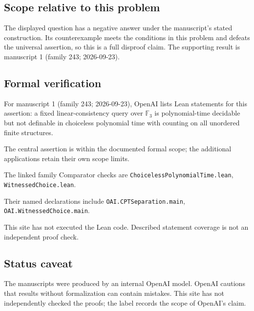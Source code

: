 \documentclass[11pt]{article}
\begin{document}
\subsection{Scope relative to this problem}
The displayed question has a negative answer under the manuscript's stated construction. Its counterexample meets the conditions in this problem and defeats the universal assertion, so this is a full disproof claim. The supporting result is manuscript 1 (family 243; 2026-09-23).

\subsection{Formal verification}
For manuscript 1 (family 243; 2026-09-23), OpenAI lists Lean statements for this assertion: a fixed linear-consistency query over $\mathbb F_3$ is polynomial-time decidable but not definable in choiceless polynomial time with counting on all unordered finite structures.

The central assertion is within the documented formal scope; the additional applications retain their own scope limits.

The linked family Comparator checks are \texttt{ChoicelessPolynomialTime.lean}, \texttt{WitnessedChoice.lean}.

Their named declarations include \texttt{OAI.CPTSeparation.main}, \texttt{OAI.WitnessedChoice.main}.

This site has not executed the Lean code. Described statement coverage is not an independent proof check.

\subsection{Status caveat}
The manuscripts were produced by an internal OpenAI model. OpenAI cautions that results without formalization can contain mistakes. This site has not independently checked the proofs; the label records the scope of OpenAI's claim.
\end{document}
